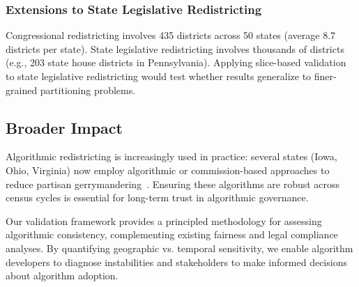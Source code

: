 \subsubsection{Extensions to State Legislative Redistricting}

Congressional redistricting involves 435 districts across 50 states (average 8.7 districts per state). State legislative redistricting involves thousands of districts (e.g., 203 state house districts in Pennsylvania). Applying slice-based validation to state legislative redistricting would test whether results generalize to finer-grained partitioning problems.

\subsection{Broader Impact}

Algorithmic redistricting is increasingly used in practice: several states (Iowa, Ohio, Virginia) now employ algorithmic or commission-based approaches to reduce partisan gerrymandering~\cite{mcghee2020}. Ensuring these algorithms are robust across census cycles is essential for long-term trust in algorithmic governance.

Our validation framework provides a principled methodology for assessing algorithmic consistency, complementing existing fairness and legal compliance analyses. By quantifying geographic vs. temporal sensitivity, we enable algorithm developers to diagnose instabilities and stakeholders to make informed decisions about algorithm adoption.
